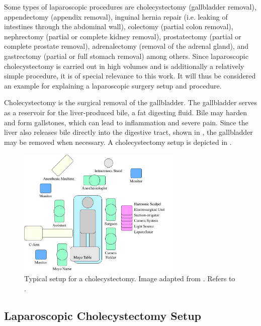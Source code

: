 Some types of laparoscopic procedures are cholecystectomy (gallbladder removal), appendectomy (appendix removal), inguinal hernia repair (i.e. leaking of intestines through the abdominal wall), colectomy (partial colon removal), nephrectomy (partial or complete kidney removal), prostatectomy (partial or complete prostate removal), adrenalectomy (removal of the adrenal gland), and gastrectomy (partial or full stomach removal) among others. Since laparoscopic cholecystectomy is carried out in high volumes and is additionally a relatively simple procedure, it is of special relevance to this work. It will thus be considered an example for explaining a laparoscopic surgery setup and procedure.

Cholecystectomy is the surgical removal of the gallbladder. The gallbladder serves as a reservoir for the liver-produced bile, a fat digesting fluid. Bile may harden and form gallstones, which can lead to inflammation and severe pain. Since the liver also releases bile directly into the digestive tract, shown in , the gallbladder may be removed when necessary. A cholecystectomy setup is depicted in .
\begin{figure}[tb]
    \centering
    \includegraphics[width=0.7\textwidth]{introduction/fig/24_01_26_room_setup.pdf}
    \caption{Typical setup for a cholecystectomy. Image adapted from \cite{sages2010room}. Refers to .}
    \label{in:fig:room_setup}
\end{figure}
\subsection{Laparoscopic Cholecystectomy Setup}
\label{in:sec:cholecystectomy_setup}

